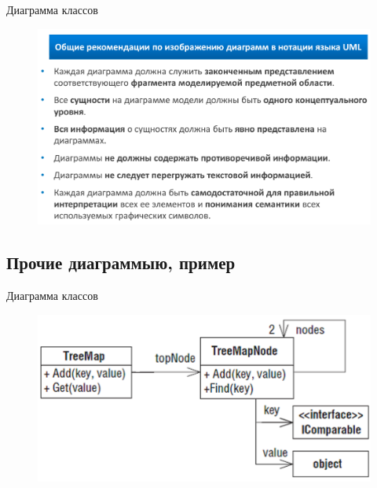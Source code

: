 \documentclass{beamer}
\begin{document}
\begin{frame}[t]{Диаграмма классов}
\begin{figure}[h]
\centering
\includegraphics[scale=0.45]{images/lec03-pic25.png}
\end{figure}
\end{frame}

\subsection{Прочие диаграммыю, пример}

\begin{frame}[t]{Диаграмма классов}
\begin{figure}[h]
\centering
\includegraphics[scale=0.45]{images/lec03-pic26.png}
\end{figure}
\end{frame}
\end{document}

